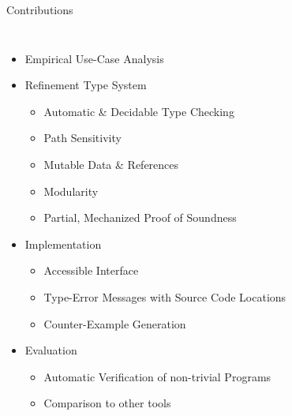 \documentclass{sdqbeamer}
\begin{document}
\begin{frame}{Contributions}
  \begin{columns}
    \begin{itemize}
      \item Empirical Use-Case Analysis
      \item Refinement Type System
      \begin{itemize}
        \item Automatic \& Decidable Type Checking
        \item Path Sensitivity
        \item Mutable Data \& References
        \item Modularity
        \item Partial, Mechanized Proof of Soundness
      \end{itemize}
      \item Implementation
      \begin{itemize}
        \item Accessible Interface
        \item Type-Error Messages with Source Code Locations
        \item Counter-Example Generation
      \end{itemize}
      \item Evaluation
      \begin{itemize}
        \item Automatic Verification of non-trivial Programs
        \item Comparison to other tools
      \end{itemize}
    \end{itemize}

  \end{columns}
\end{frame}
\end{document}
